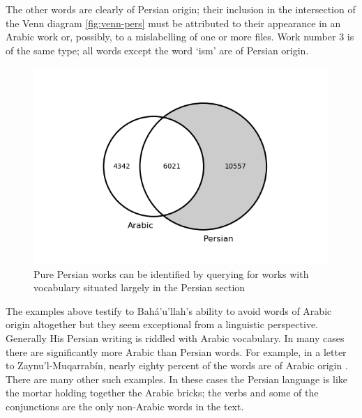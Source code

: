 \documentclass[12pt, oneside]{report}
\begin{document}
The other words are clearly of Persian origin; their inclusion in the intersection of the Venn diagram \autoref{fig:venn-pers} must be attributed to their appearance in an Arabic work or, possibly, to a mislabelling of one or more files.
Work number 3 is of the same type; all words except the word `ism' are of Persian origin.
\begin{figure}
	\centering\captionsetup[subfigure]{justification=centering}
	\includegraphics[width=\linewidth]{figures/venn-persian.png}
	\caption[Venn diagram with Persian section highlighted]{Pure Persian works can be identified by querying for works with vocabulary situated largely in the Persian section}\label{fig:venn-pers}
\end{figure}
\par
The examples above testify to Bah\'{a}'u'llah's ability to avoid words of Arabic origin altogether but they seem exceptional from a linguistic perspective.
Generally His Persian writing is riddled with Arabic vocabulary.
In many cases there are significantly more Arabic than Persian words.
For example, in a letter to Zaynu'l-Muqarrab\'{i}n, nearly eighty percent of the words are of Arabic origin \cite{bahaullah_muntakhabati-az_163}.
There are many other such examples.
In these cases the Persian language is like the mortar holding together the Arabic bricks; the verbs and some of the conjunctions are the only non-Arabic words in the text.
\end{document}
